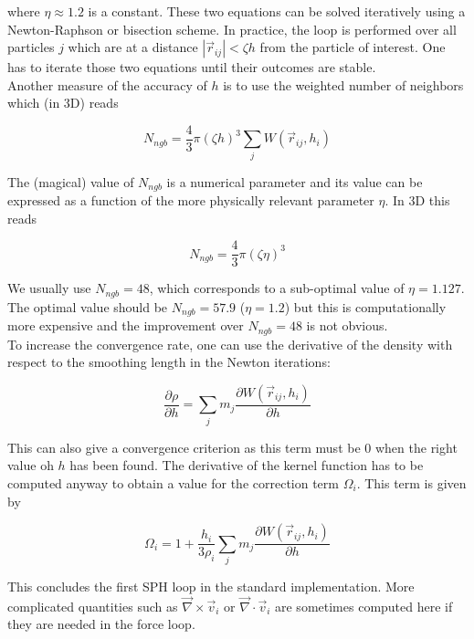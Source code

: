 \documentclass[a4paper,10pt]{article}
\begin{document}
where $\eta \approx 1.2$ is a constant. These two equations can be solved iteratively using a Newton-Raphson or
bisection scheme. In practice, the loop is performed over all particles $j$ which are at a distance
$|\vec{r}_{ij}|<\zeta
h$ from the particle of interest. One has to iterate those two equations until their outcomes are stable.\\
Another measure of the accuracy of $h$ is to use the weighted number of neighbors which (in 3D) reads

\begin{equation}
 N_{ngb} = \frac{4}{3}\pi \left(\zeta h\right)^3 \sum_j W(\vec{r}_{ij},h_i)
\end{equation}

The (magical) value of $N_{ngb}$ is a numerical parameter and its value can be expressed as a function of the more
physically relevant parameter $\eta$. In 3D this reads

\begin{equation}
 N_{ngb} = \frac{4}{3}\pi\left(\zeta \eta\right)^3
\end{equation}

We usually use $N_{ngb} = 48$, which corresponds to a sub-optimal value of $\eta=1.127$. The optimal value should be
$N_{ngb}=57.9$ ($\eta=1.2$) but this is computationally more expensive and the improvement over $N_{ngb}=48$ is not
obvious.\\ 

To increase the convergence rate, one can use the derivative of the density with respect to the smoothing length in the
Newton iterations:

\begin{equation}
 \frac{\partial \rho}{\partial h} = \sum_j m_j \frac{\partial W(\vec{r}_{ij},h_i)}{\partial h}
\end{equation}

This can also give a convergence criterion as this term must be $0$ when the right value oh $h$ has been found.
The derivative of the kernel function has to be computed anyway to obtain a value for the correction term $\Omega_i$.
This term is given by

\begin{equation}
  \Omega_i = 1 + \frac{h_i}{3\rho_i}\sum_j m_j\frac{\partial W(\vec{r}_{ij},h_i)}{\partial h}
\end{equation}

This concludes the first SPH loop in the standard implementation. More complicated quantities such as
$\vec\nabla\times\vec v_i$ or $\vec\nabla\cdot\vec v_i$ are sometimes computed here if they are needed in the force
loop.
\end{document}
